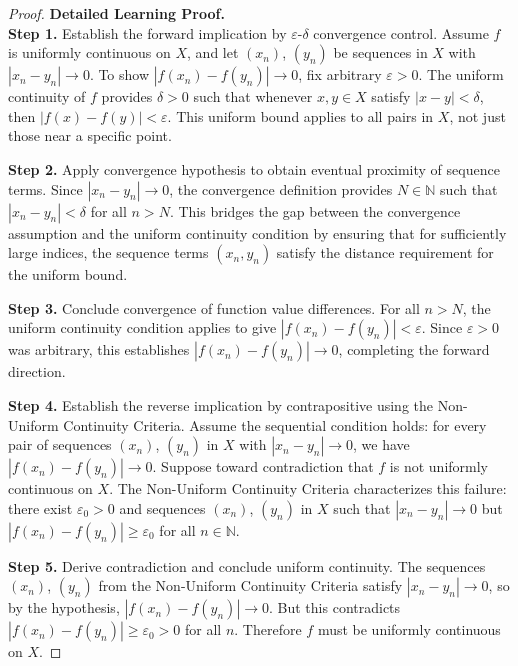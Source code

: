 \begin{proof}
\textbf{Detailed Learning Proof.}~\\

\textbf{Step 1.} Establish the forward implication by $\varepsilon$-$\delta$ convergence control.
Assume $f$ is uniformly continuous on $X$, and let $(x_n)$, $(y_n)$ be sequences in $X$ with $|x_n - y_n| \to 0$. To show $|f(x_n) - f(y_n)| \to 0$, fix arbitrary $\varepsilon > 0$. The uniform continuity of $f$ provides $\delta > 0$ such that whenever $x, y \in X$ satisfy $|x - y| < \delta$, then $|f(x) - f(y)| < \varepsilon$. This uniform bound applies to all pairs in $X$, not just those near a specific point.

\textbf{Step 2.} Apply convergence hypothesis to obtain eventual proximity of sequence terms.
Since $|x_n - y_n| \to 0$, the convergence definition provides $N \in \mathbb{N}$ such that $|x_n - y_n| < \delta$ for all $n > N$. This bridges the gap between the convergence assumption and the uniform continuity condition by ensuring that for sufficiently large indices, the sequence terms $(x_n, y_n)$ satisfy the distance requirement for the uniform bound.

\textbf{Step 3.} Conclude convergence of function value differences.
For all $n > N$, the uniform continuity condition applies to give $|f(x_n) - f(y_n)| < \varepsilon$. Since $\varepsilon > 0$ was arbitrary, this establishes $|f(x_n) - f(y_n)| \to 0$, completing the forward direction.

\textbf{Step 4.} Establish the reverse implication by contrapositive using the Non-Uniform Continuity Criteria.
Assume the sequential condition holds: for every pair of sequences $(x_n)$, $(y_n)$ in $X$ with $|x_n - y_n| \to 0$, we have $|f(x_n) - f(y_n)| \to 0$. Suppose toward contradiction that $f$ is not uniformly continuous on $X$. The Non-Uniform Continuity Criteria characterizes this failure: there exist $\varepsilon_0 > 0$ and sequences $(x_n)$, $(y_n)$ in $X$ such that $|x_n - y_n| \to 0$ but $|f(x_n) - f(y_n)| \geq \varepsilon_0$ for all $n \in \mathbb{N}$.

\textbf{Step 5.} Derive contradiction and conclude uniform continuity.
The sequences $(x_n)$, $(y_n)$ from the Non-Uniform Continuity Criteria satisfy $|x_n - y_n| \to 0$, so by the hypothesis, $|f(x_n) - f(y_n)| \to 0$. But this contradicts $|f(x_n) - f(y_n)| \geq \varepsilon_0 > 0$ for all $n$. Therefore $f$ must be uniformly continuous on $X$.
\end{proof}

